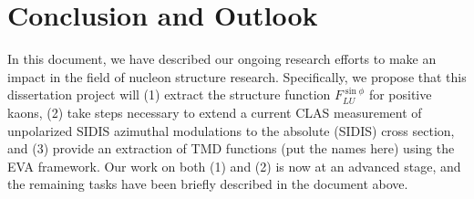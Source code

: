 \section{Conclusion and Outlook}
In this document, we have described our ongoing research efforts to make an impact in the field of nucleon structure research.  Specifically, we propose that this dissertation project will (1) extract the structure function $F_{LU}^{\sin\phi}$ for positive kaons, (2) take steps necessary to extend a current CLAS measurement of unpolarized SIDIS azimuthal modulations to the absolute (SIDIS) cross section, and (3) provide an extraction of TMD functions (put the names here) using the EVA framework.  Our work on both (1) and (2) is now at an advanced stage, and the remaining tasks have been briefly described in the document above.  
